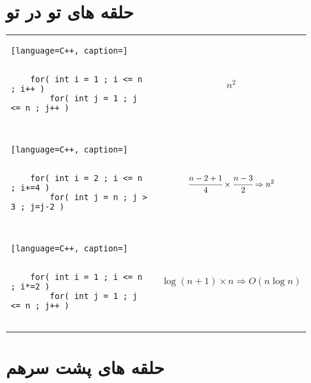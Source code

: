 \documentclass[12pt]{book}
\begin{document}
\newpage


\section{حلقه های تو در تو}




\begin{latin}
\begin{center}
  \bgroup
  \def\arraystretch{1.5}%
  \begin{tabular}{ Y C  }
    \begin{lstlisting}[language=C++, caption=]
    
    
	for( int i = 1 ; i <= n ; i++ )
		for( int j = 1 ; j <= n ; j++ )
			
	\end{lstlisting}
    &
    \colorbox{gray!10}{\parbox{90pt}{
    $$n^{2}$$
    }}
     \\ 
     \begin{lstlisting}[language=C++, caption=]
     
     
	for( int i = 2 ; i <= n ; i+=4 )
		for( int j = n ; j > 3 ; j=j-2 )
			
	\end{lstlisting}
    &
    \colorbox{gray!10}{\parbox{140pt}{
    $$\cfrac{n-2+1}{4} \times \cfrac{n-3}{2} \Rightarrow n^{2}$$
    }}
     \\ 
     \begin{lstlisting}[language=C++, caption=]
     
     
	for( int i = 1 ; i <= n ; i*=2 )
		for( int j = 1 ; j <= n ; j++ )
			
	\end{lstlisting}
    &
    \colorbox{gray!10}{\parbox{160pt}{
    $$\log{(n+1)} \times n \Rightarrow O(n\log{n})$$
    }}
     \\ 
  \end{tabular}
  \egroup
\end{center}
\end{latin}



\newpage



\section{حلقه های پشت سرهم}
\end{document}
